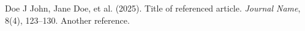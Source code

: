 \begin{adjustwidth}{0.35\textwidth}{0pt}
\section*{}
\begin{thebibliography}{9}
 Doe J John, Jane Doe, et al. (2025). Title of referenced article. \textit{Journal Name}, 8(4), 123–130.
 Another reference.
\end{thebibliography}
\end{adjustwidth}
